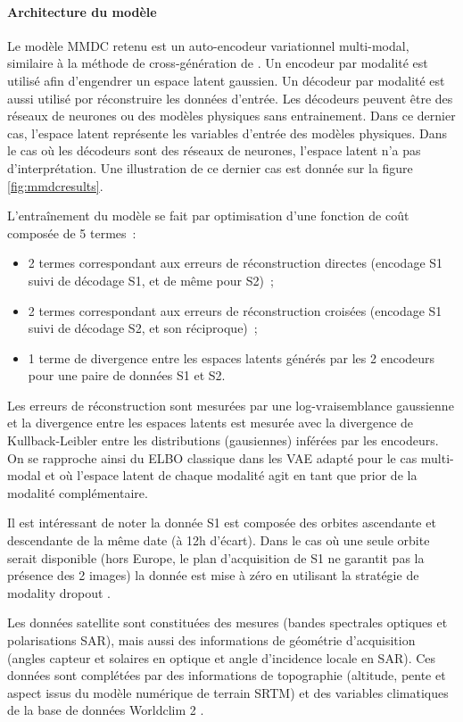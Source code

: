 \paragraph{Architecture du modèle}
Le modèle MMDC retenu est un auto-encodeur variationnel multi-modal, similaire à la méthode de cross-génération de \cite{shi-2019-variat-mixtur}. Un encodeur par modalité est utilisé afin d’engendrer un espace latent gaussien. Un décodeur par modalité est aussi utilisé por réconstruire les données d’entrée. Les décodeurs peuvent être des réseaux de neurones ou des modèles physiques sans entrainement. Dans ce dernier cas, l’espace latent représente les variables d’entrée des modèles physiques. Dans le cas où les décodeurs sont des réseaux de neurones, l’espace latent n’a pas d’interprétation. Une illustration de ce dernier cas est donnée sur la figure \ref{fig:mmdcresults}.

L’entraînement du modèle se fait par optimisation d’une fonction de coût composée de 5 termes :
\begin{itemize}
\item 2 termes correspondant aux erreurs de réconstruction directes (encodage S1 suivi de décodage S1, et de même pour S2) ;
\item 2 termes correspondant aux erreurs de réconstruction croisées (encodage S1 suivi de décodage S2, et son réciproque) ;
\item 1 terme de divergence entre les espaces latents générés par les 2 encodeurs pour une paire de données S1 et S2.
\end{itemize}

Les erreurs de réconstruction sont mesurées par une log-vraisemblance gaussienne et la divergence entre les espaces latents est mesurée avec la divergence de Kullback-Leibler entre les distributions (gausiennes) inférées par les encodeurs. On se rapproche ainsi du ELBO classique dans les VAE adapté pour le cas multi-modal et où l’espace latent de chaque modalité agit en tant que prior de la modalité complémentaire.

Il est intéressant de noter la donnée S1 est composée des orbites ascendante et descendante de la même date (à 12h d’écart). Dans le cas où une seule orbite serait disponible (hors Europe, le plan d’acquisition de S1 ne garantit pas la présence des 2 images) la donnée est mise à zéro en utilisant la stratégie de modality dropout \cite{neverova-2016-moddr}.

Les données satellite sont constituées des mesures (bandes spectrales optiques et polarisations SAR), mais aussi des informations de géométrie d’acquisition (angles capteur et solaires en optique et angle d’incidence locale en SAR). Ces données sont complétées par des informations de topographie (altitude, pente et aspect issus du modèle numérique de terrain SRTM) et des variables climatiques de la base de données Worldclim 2 \cite{fick17_world}.

